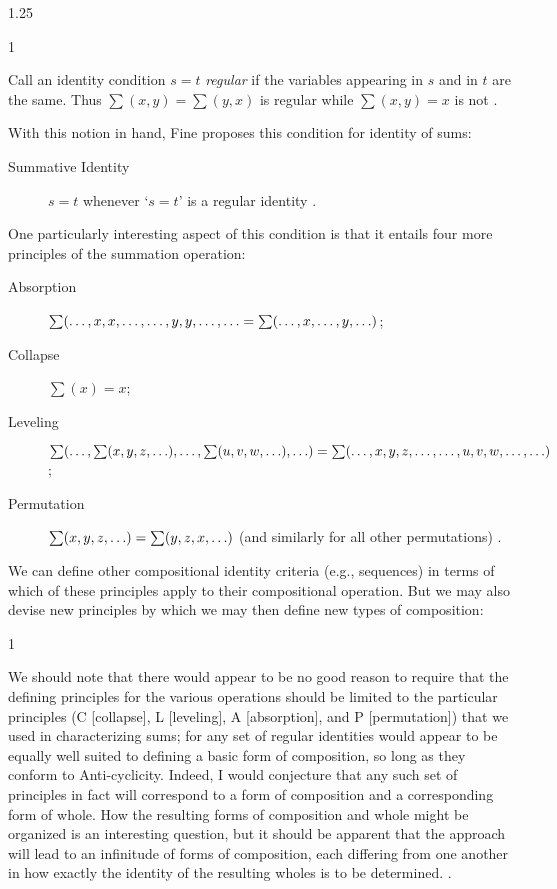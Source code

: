 \documentclass[11pt]{article}
\newenvironment{squote}{%
\begin{spacing}{1}
       	\begin{list}{}{%
\setlength{\labelwidth}{0pt}%
\rightmargin\leftmargin%
}
\item\relax
}{%
\end{list}%
\end{spacing}
}
\begin{document}
\begin{spacing}{1.25}
\begin{squote}
Call an identity condition $s = t$ {\em regular} if the variables
appearing in $s$ and in $t$ are the same.  Thus $\sum (x, y) = \sum
(y, x)$ is regular while $\sum (x, y) = x$ is not
\citeyearpar[572]{fine2010}.
\end{squote}

With this notion in hand, Fine proposes this condition for identity of
sums:

\begin{description}
  \item[Summative Identity] $s = t$ whenever `$s = t$' is a regular
    identity \citeyearpar[572]{fine2010}.
\end{description}

One particularly interesting aspect of this condition is that it
entails four more principles of the summation operation:

\begin{description}
  \item[Absorption] $\sum (\mathellipsis, x, x, \mathellipsis,
    \mathellipsis, y, y, \mathellipsis, \mathellipsis = \sum (
    \mathellipsis, x, \mathellipsis, y, \mathellipsis )$;
\item[Collapse] $\sum (x) = x$;
\item[Leveling] $\sum (\mathellipsis, \sum (x, y, z, \mathellipsis ),
  \mathellipsis, \sum (u, v, w, \mathellipsis ), \mathellipsis ) = \sum
  (\mathellipsis, x, y, z, \mathellipsis, \mathellipsis, u, v, w,
  \mathellipsis, \mathellipsis )$;
\item[Permutation] $\sum (x, y, z, \mathellipsis ) = \sum (y, z, x,
  \mathellipsis )$ (and similarly for all other permutations)
  \citep[573]{fine2010}.
\end{description}

We can define other compositional identity criteria (e.g., sequences)
in terms of which of these principles apply to their compositional
operation.  But we may also devise new principles by which we may then
define new types of composition:

\begin{squote}
We should note that there would appear to be no good reason to require
that the defining principles for the various operations should be
limited to the particular principles (C [collapse], L [leveling], A
[absorption], and P [permutation]) that we used in characterizing
sums; for any set of regular identities would appear to be equally
well suited to defining a basic form of composition, so long as they
conform to Anti-cyclicity.  Indeed, I would conjecture that any such
set of principles in fact will correspond to a form of composition and
a corresponding form of whole.  How the resulting forms of composition
and whole might be organized is an interesting question, but it should
be apparent that the approach will lead to an infinitude of forms of
composition, each differing from one another in how exactly the
identity of the resulting wholes is to be
determined. \citep[575--576]{fine2010}.
\end{squote}


\end{spacing}
\end{document}

